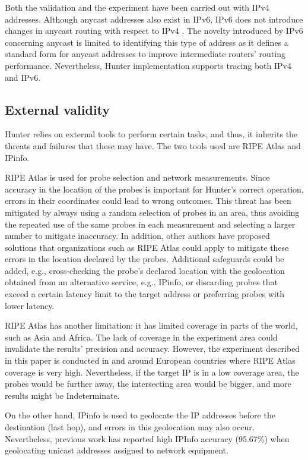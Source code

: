 \documentclass[preprint,12pt]{elsarticle}
\begin{document}
Both the validation and the experiment have been carried out with IPv4 addresses. Although anycast addresses also exist in IPv6, IPv6 does not introduce changes in anycast routing with respect to IPv4 \cite{Conta2006InternetSpecification}. The novelty introduced by IPv6 concerning anycast is limited to identifying this type of address as it defines a standard form for anycast addresses to improve intermediate routers’ routing performance. Nevertheless, Hunter implementation supports tracing both IPv4 and IPv6.

\subsection{External validity}
Hunter relies on external tools to perform certain tasks, and thus, it inherits the threats and failures that these may have. The two tools used are RIPE Atlas and IPinfo. 

RIPE Atlas is used for probe selection and network measurements. Since accuracy in the location of the probes is important for Hunter's correct operation, errors in their coordinates could lead to wrong outcomes. This threat has been mitigated by always using a random selection of probes in an area, thus avoiding the repeated use of the same probes in each measurement and selecting a larger number to mitigate inaccuracy. In addition, other authors \cite{Kohls2022VerLoc:Systems} have proposed solutions that organizations such as RIPE Atlas could apply to mitigate these errors in the location declared by the probes. Additional safeguards could be added, e.g., cross-checking the probe's declared location with the geolocation obtained from an alternative service, e.g., IPinfo, or discarding probes that exceed a certain latency limit to the target address or preferring probes with lower latency.

RIPE Atlas has another limitation: it has limited coverage in parts of the world, such as Asia and Africa. The lack of coverage in the experiment area could invalidate the results' precision and accuracy. However, the experiment described in this paper is conducted in and around European countries where RIPE Atlas coverage is very high. Nevertheless, if the target IP is in a low coverage area, the probes would be further away, the intersecting area would be bigger, and more results might be Indeterminate.

On the other hand, IPinfo is used to geolocate the IP addresses before the destination (last hop), and errors in this geolocation may also occur. Nevertheless, previous work \cite{Cozar2022ReliabilityTransfers} has reported high IPInfo accuracy (95.67\%) when geolocating unicast addresses assigned to network equipment.
\end{document}
